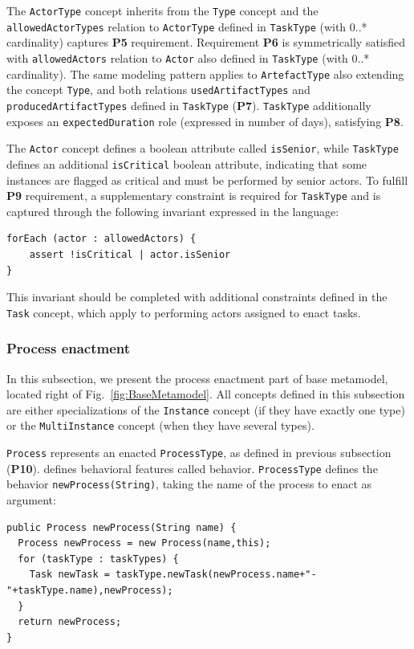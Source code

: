 The \texttt{ActorType} concept inherits from the \texttt{Type} concept and the
\texttt{allowedActorTypes} relation to \texttt{ActorType} defined in
\texttt{TaskType} (with 0..* cardinality) captures \textbf{P5} requirement.
Requirement \textbf{P6} is symmetrically satisfied with \texttt{allowedActors}
relation to \texttt{Actor} also defined in \texttt{TaskType} (with 0..*
cardinality). The same modeling pattern applies to \texttt{ArtefactType} also
extending the concept \texttt{Type}, and both relations
\texttt{usedArtifactTypes} and \texttt{producedArtifactTypes} defined in
\texttt{TaskType} (\textbf{P7}). \texttt{TaskType} additionally exposes an
\texttt{expectedDuration} role (expressed in number of days), satisfying
\textbf{P8}.

The \texttt{Actor} concept defines a boolean attribute called
\texttt{isSenior}, while \texttt{TaskType} defines an additional
\texttt{isCritical} boolean attribute, indicating that some instances are
flagged as critical and must be performed by senior actors. To fulfill
\textbf{P9} requirement, a supplementary constraint is required for
\texttt{TaskType} and is captured through the following invariant expressed in
the \FML language:
\begin{lstlisting}
forEach (actor : allowedActors) {
    assert !isCritical | actor.isSenior
}
\end{lstlisting}

This invariant should be completed with additional constraints defined in the
\texttt{Task} concept, which apply to performing actors assigned to enact
tasks.

\subsubsection{Process enactment}
\label{sec:ProcessEnactment}
In this subsection, we present the process enactment part of base metamodel,
located right of Fig.~\ref{fig:BaseMetamodel}. All concepts defined in this
subsection are either specializations of the \texttt{Instance} concept (if they
  have exactly one type) or the \texttt{MultiInstance} concept (when they have
  several types).

\texttt{Process} represents an enacted \texttt{ProcessType}, as defined in
previous subsection (\textbf{P10}). \FML defines behavioral features called
behavior. \texttt{ProcessType} defines the behavior
\texttt{newProcess(String)}, taking the name of the process to enact as
argument:

\begin{lstlisting}
public Process newProcess(String name) {
  Process newProcess = new Process(name,this);
  for (taskType : taskTypes) {
    Task newTask = taskType.newTask(newProcess.name+"-"+taskType.name),newProcess);
  }
  return newProcess;
}
\end{lstlisting}

